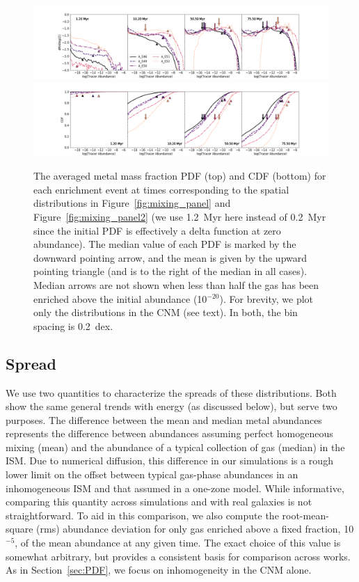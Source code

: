 \documentclass[twocolumn]{aastex62}
\begin{document}
\begin{figure}
    \hspace*{-1.8cm}
  \includegraphics[width=1.2\linewidth]{CNM_PDF_histograms_marked}
     \hspace*{-1.8cm}
  \includegraphics[width=1.2\linewidth]{CNM_CDF_histograms_marked}  
  \caption{The averaged metal mass fraction PDF (top) and CDF (bottom) for each enrichment event at times corresponding to the spatial distributions in Figure~\ref{fig:mixing_panel} and Figure~\ref{fig:mixing_panel2} (we use 1.2~Myr here instead of 0.2~Myr since the initial PDF is effectively a delta function at zero abundance). The median value of each PDF is marked by the downward pointing arrow, and the mean is given by the upward pointing triangle (and is to the right of the median in all cases). 
  Median arrows are not shown when less than half the gas has been enriched above the initial abundance (10$^{-20}$). For brevity, we plot only the distributions in the CNM (see text). In both, the bin spacing is 0.2~dex.}
  \label{fig:CNM-PDFS}
\end{figure}

\subsection{Spread}
\label{sec:spread}

We use two quantities to characterize the spreads of these distributions. Both show the same general trends with energy (as discussed below), but serve two purposes.
The difference between the mean and median metal abundances represents the difference between abundances assuming perfect homogeneous mixing (mean) and the abundance of a typical collection of gas (median) in the ISM. Due to numerical diffusion, this difference in our simulations is a rough lower limit on the offset between typical gas-phase abundances in an inhomogeneous ISM and that assumed in a one-zone model.  While informative, comparing this quantity across simulations and with real galaxies is not straightforward. To aid in this comparison, we also compute the root-mean-square (rms) abundance deviation for only gas enriched above a fixed fraction, 10$^{-5}$, of the mean abundance at any given time. The exact choice of this value is somewhat arbitrary, but provides a consistent basis for comparison across works. As in Section~\ref{sec:PDF}, we focus on inhomogeneity in the CNM alone.
\end{document}
